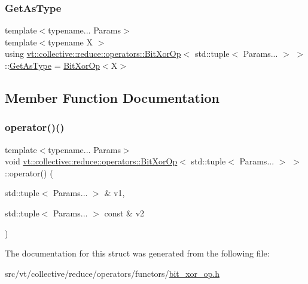 \subsubsection{\texorpdfstring{Get\+As\+Type}{GetAsType}}
{\footnotesize\ttfamily template$<$typename... Params$>$ \\
template$<$typename X $>$ \\
using \hyperlink{structvt_1_1collective_1_1reduce_1_1operators_1_1_bit_xor_op}{vt\+::collective\+::reduce\+::operators\+::\+Bit\+Xor\+Op}$<$ std\+::tuple$<$ Params... $>$ $>$\+::\hyperlink{structvt_1_1collective_1_1reduce_1_1operators_1_1_bit_xor_op_3_01std_1_1tuple_3_01_params_8_8_8_01_4_01_4_ac87adfaac6d907dea649b1a035dc6cb3}{Get\+As\+Type} =  \hyperlink{structvt_1_1collective_1_1reduce_1_1operators_1_1_bit_xor_op}{Bit\+Xor\+Op}$<$X$>$}



\subsection{Member Function Documentation}
\mbox{\label{structvt_1_1collective_1_1reduce_1_1operators_1_1_bit_xor_op_3_01std_1_1tuple_3_01_params_8_8_8_01_4_01_4_adce36dc07b6e947db92573ff47dfd412}} 
\subsubsection{\texorpdfstring{operator()()}{operator()()}}
{\footnotesize\ttfamily template$<$typename... Params$>$ \\
void \hyperlink{structvt_1_1collective_1_1reduce_1_1operators_1_1_bit_xor_op}{vt\+::collective\+::reduce\+::operators\+::\+Bit\+Xor\+Op}$<$ std\+::tuple$<$ Params... $>$ $>$\+::operator() (\begin{DoxyParamCaption}\item[{std\+::tuple$<$ Params... $>$ \&}]{v1,  }\item[{std\+::tuple$<$ Params... $>$ const \&}]{v2 }\end{DoxyParamCaption})\hspace{0.3cm}{\ttfamily [inline]}}



The documentation for this struct was generated from the following file\+:\begin{DoxyCompactItemize}
\item 
src/vt/collective/reduce/operators/functors/\hyperlink{bit__xor__op_8h}{bit\+\_\+xor\+\_\+op.\+h}\end{DoxyCompactItemize}
